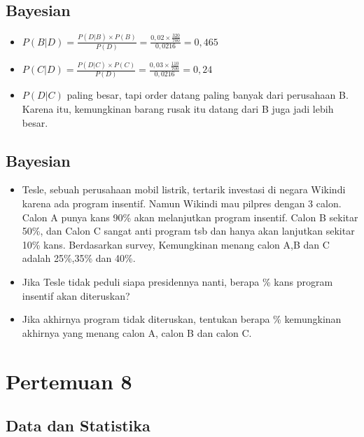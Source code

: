 \documentclass[
  letterpaper,
  DIV=11,
  numbers=noendperiod]{scrartcl}
\begin{document}
\subsection{Bayesian}\label{bayesian-1}

\begin{itemize}
\item
  \(P(B|D)=\frac{P(D|B) \times P(B)}{P(D)}=\frac{0,02 \times \frac{320}{700}}{0,0216}=0,465\)
\item
  \(P(C|D)=\frac{P(D|C) \times P(C)}{P(D)}=\frac{0,03 \times \frac{110}{700}}{0,0216}=0,24\)
\item
  \(P(D|C)\) paling besar, tapi order datang paling banyak dari
  perusahaan B. Karena itu, kemungkinan barang rusak itu datang dari B
  juga jadi lebih besar.
\end{itemize}

\subsection{Bayesian}\label{bayesian-2}

\begin{itemize}
\item
  Tesle, sebuah perusahaan mobil listrik, tertarik investasi di negara
  Wikindi karena ada program insentif. Namun Wikindi mau pilpres dengan
  3 calon. Calon A punya kans 90\% akan melanjutkan program insentif.
  Calon B sekitar 50\%, dan Calon C sangat anti program tsb dan hanya
  akan lanjutkan sekitar 10\% kans. Berdasarkan survey, Kemungkinan
  menang calon A,B dan C adalah 25\%,35\% dan 40\%.
\item
  Jika Tesle tidak peduli siapa presidennya nanti, berapa \% kans
  program insentif akan diteruskan?
\item
  Jika akhirnya program tidak diteruskan, tentukan berapa \% kemungkinan
  akhirnya yang menang calon A, calon B dan calon C.
\end{itemize}

\section{Pertemuan 8}\label{pertemuan-8}

\subsection{Data dan Statistika}\label{data-dan-statistika}
\end{document}
